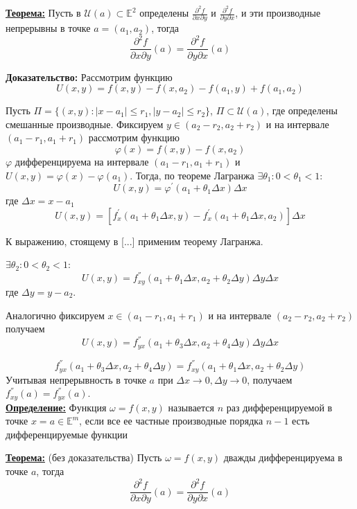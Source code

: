 \documentclass[a4paper,12pt]{article} %
\begin{document}
	\underline{\textbf{Теорема:}} Пусть в $\mathscr{U}(a) \subset \mathbb{E}^2$ определены $\frac{\partial^2f}{\partial x\partial y}$ и $\frac{\partial^2f}{\partial y\partial x}$, и эти производные непрерывны в точке $a = (a_1, a_2)$, тогда
	\[
	\frac{\partial^2f}{\partial{x}\partial{y}}(a) = \frac{\partial^2f}{\partial{y}\partial{x}}(a)
	\]
	
	\textbf{Доказательство:} Рассмотрим функцию
	\[
	U(x, y) = f(x, y) - f(x, a_2) - f(a_1, y) + f(a_1, a_2)
	\]
	
	Пусть $\Pi = \{(x, y) : |x - a_1|\leqslant r_1, |y-a_2| \leqslant r_2\}$, $\Pi \subset \mathscr{U}(a)$, где определены смешанные производные. Фиксируем $y\in (a_2-r_2, a_2+r_2)$ и на интервале $(a_1-r_1, a_1+r_1)$ рассмотрим функцию 
	\[
	\varphi(x) = f(x, y) - f(x, a_2)
	\]
	$\varphi$ дифференцируема на интервале $(a_1-r_1, a_1+r_1)$ и $U(x, y) = \varphi(x) - \varphi(a_1)$.
	Тогда, по теореме Лагранжа $\exists \theta_1: 0<\theta_1<1$:
	\[
	U(x, y) = \varphi^{'}(a_1 + \theta_1\Delta x)\Delta x
	\]
	где $\Delta x = x-a_1$
	\[
	U(x, y) = [f^{'}_x(a_1+\theta_1\Delta x, y)-f^{'}_x(a_1+\theta_1\Delta x, a_2) ]\Delta x
	\]
	
	К выражению, стоящему в [...] применим теорему Лагранжа.
	
	$\exists\theta_2: 0<\theta_2<1$:
	\[
	U(x, y) = f^{''}_{xy}(a_1+\theta_1\Delta x, a_2+\theta_2\Delta y)\Delta y\Delta x
	\]
	где $\Delta y = y-a_2$.
	\vspace{5mm}
	
	Аналогично фиксируем $x\in(a_1-r_1, a_1+r_1)$ и на интервале $(a_2-r_2, a_2+r_2)$ получаем
	\[
	U(x, y) = f^{''}_{yx}(a_1+\theta_3\Delta x, a_2+\theta_4\Delta y)\Delta y\Delta x
	\]
	
	\[
	f^{''}_{yx}(a_1+\theta_3\Delta x, a_2+\theta_4\Delta y) = f^{''}_{xy}(a_1+\theta_1\Delta x, a_2+\theta_2\Delta y)
	\]
	Учитывая непрерывность в точке $a$ при $\Delta x\to0, \Delta y\to0$, получаем $f^{''}_{xy}(a) = f^{''}_{yx}(a)$.\\
	
	
	\underline{\textbf{Определение:}} Функция $\omega = f(x, y)$ называется $n$ раз дифференцируемой в точке $x = a\in \mathbb{E}^m$, если все ее частные производные порядка $n-1$ есть дифференцируемые функции
	\vspace{5mm}
	
	\underline{\textbf{Теорема:}} (без доказательства) Пусть $\omega = f(x, y)$ дважды дифференцируема в точке $a$, тогда
	\[
	\frac{\partial^2f}{\partial{x}\partial{y}}(a) = \frac{\partial^2f}{\partial{y}\partial{x}}(a)
	\]
	
\end{document}
